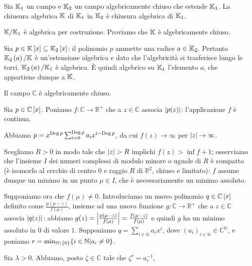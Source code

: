 \begin{Theorem}
	Sia $\mathbb{K}_1$ un campo e $\mathbb{K}_2$ un campo algebricamente chiuso che estende $\mathbb{K}_1$. La chiusura algebrica $\mathbb{K}$ di $\mathbb{K}_1$ in $\mathbb{K}_2$ \`e chiusura algebrica di $\mathbb{K}_1$.
\end{Theorem}
\Proof $\mathbb{K}/\mathbb{K}_1$ \`e algebrica per costruzione. Proviamo che $\mathbb{K}$ \`e algebricamente chiuso.
\par Sia $p \in \mathbb{K} \left [ x \right ] \subseteq \mathbb{K}_2 \left [ x \right ]$: il polinomio $p$ ammette una radice $a \in \mathbb{K}_2$. Pertanto $\mathbb{K}_2 \left ( a \right )/\mathbb{K}$ \`e un'estensione algebrica e dato che l'algebricit\`a si trasferisce lungo le torri, $\mathbb{K}_2 \left ( a \right )/\mathbb{K}_1$ \`e algebrica. \`E quindi algebrico su $\mathbb{K}_1$ l'elemento $a$, che appartiene dunque a $\mathbb{K}$. \EndProof
\begin{Theorem}
	 Il campo $\mathbb{C}$ \`e algebricamente chiuso.
\end{Theorem}
\Proof Sia $p \in \mathbb{C} \left [ x \right ]$. Poniamo $f: \mathbb{C} \rightarrow \mathbb{R}^+$ che a $z \in \mathbb{C}$ associa $\left \lvert p(z) \right \rvert$: l'applicazione $f$ \`e continua.
\par Abbiamo $p = x^{\operatorname{Deg}{p}}\sum_{i = 0}^{\operatorname{Deg} p}a_ix^{i - \operatorname{Deg}{p}}$, da cui $f(z) \rightarrow \infty$ per $\left \lvert z \right \rvert \rightarrow \infty$.
\par Scegliamo $R > 0$ in modo tale che $\left \lvert z \right \rvert > R$ implichi $f(z) > \inf f + 1$; osserviamo che l'insieme $I$ dei numeri complessi di modulo minore o uguale di $R$ \`e compatto (\`e isomorfo al cerchio di centro $0$ e raggio $R$ di $\mathbb{R}^2$, chiuso e limitato): $f$ assume dunque un minimo in un punto $\mu \in I$, che \`e necessariamente un minimo assoluto.
\par Supponiamo ora che $f(\mu) \neq 0$. Introduciamo un nuovo polinomio $q \in \mathbb{C} \left [ x \right ]$ definito come $\frac{p(\mu - z)}{f(\mu)}$, insieme ad una nuova funzione $g: \mathbb{C} \rightarrow \mathbb{R}^+$ che a $z \in \mathbb{C}$ associa $\left \lvert q(z) \right \rvert$: abbiamo $g(z) = \left \lvert \frac{p(\mu - z)}{f(\mu)} \right \rvert = \frac{f(\mu - z)}{f(\mu)}$ e quindi $g$ ha un minimo assoluto in $0$ di valore $1$. Supponiamo $q = \sum_{i \in \mathbb{N}} a_ix^i$, dove $(a_i)_{i \in \mathbb{N}} \in \mathbb{C}^\mathbb{N}$, e poniamo $r = \min_{\mathbb{N} \setminus \lbrace 0 \rbrace} \lbrace i \in \mathbb{N} | a_i \neq 0 \rbrace$.
\par Sia $\lambda > 0$. Abbiamo, posto $\zeta \in \mathbb{C}$ tale che $\zeta^r = a_r^{-1}$,
